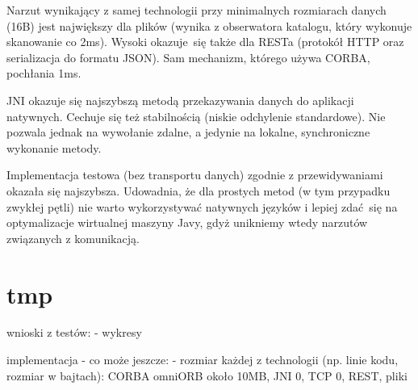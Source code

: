 Narzut wynikający z samej technologii przy minimalnych rozmiarach danych (16B) jest największy dla plików (wynika z obserwatora katalogu, który wykonuje skanowanie co 2ms). Wysoki okazuje się także dla RESTa (protokół HTTP oraz serializacja do formatu JSON). Sam mechanizm, którego używa CORBA, pochłania 1ms.


JNI okazuje się najszybszą metodą przekazywania danych do aplikacji natywnych. Cechuje się też stabilnością (niskie odchylenie standardowe). Nie pozwala jednak na wywołanie zdalne, a jedynie na lokalne, synchroniczne wykonanie metody.




Implementacja testowa (bez transportu danych) zgodnie z przewidywaniami okazała się najszybsza. Udowadnia, że dla prostych metod (w tym przypadku zwykłej pętli) nie warto wykorzystywać natywnych języków i lepiej zdać się na optymalizacje wirtualnej maszyny Javy, gdyż unikniemy wtedy narzutów związanych z komunikacją.


\section{tmp}

wnioski z testów:
- wykresy

implementacja - co może jeszcze:
- rozmiar każdej z technologii (np. linie kodu, rozmiar w bajtach): CORBA omniORB około 10MB, JNI 0, TCP 0, REST, pliki
